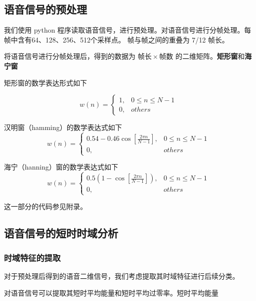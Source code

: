 \hypertarget{ux8bedux97f3ux4fe1ux53f7ux7684ux9884ux5904ux7406}{%
\subsection{语音信号的预处理}\label{ux8bedux97f3ux4fe1ux53f7ux7684ux9884ux5904ux7406}}

我们使用 python
程序读取语音信号，进行预处理。对语音信号进行分帧处理。每帧中含有64、128、256、512个采样点。
帧与帧之间的重叠为 7/12 帧长。


将语音信号进行分帧处理后，得到的数据为 \(帧长 \times 帧数\)
的二维矩阵。\textbf{矩形窗}和\textbf{海宁窗}

矩形窗的数学表达形式如下

\[ w(n) =  \begin{cases} 1, & 0\leq n \leq N-1 \\ 0,  & others \end{cases} \]

汉明窗（hamming）的数学表达式如下
\[ w(n) = \begin{cases} 0.54 - 0.46\cos[\frac{2\pi n}{N-1}], & 0\leq n \leq N-1 \\ 0, & others  \end{cases}\]

海宁（hanning）窗的数学表达式如下
\[ w(n) = \begin{cases} 0.5(1 - \cos[\frac{2\pi n}{N-1}]), & 0\leq n \leq N-1 \\ 0, & others  \end{cases}\]

这一部分的代码参见附录。

\hypertarget{ux8bedux97f3ux4fe1ux53f7ux7684ux77edux65f6ux65f6ux57dfux5206ux6790}{%
\subsection{语音信号的短时时域分析}\label{ux8bedux97f3ux4fe1ux53f7ux7684ux77edux65f6ux65f6ux57dfux5206ux6790}}

\hypertarget{ux65f6ux57dfux7279ux5f81ux7684ux63d0ux53d6}{%
\subsubsection{时域特征的提取}\label{ux65f6ux57dfux7279ux5f81ux7684ux63d0ux53d6}}

对于预处理后得到的语音二维信号，我们考虑提取其时域特征进行后续分类。

对语音信号可以提取其短时平均能量和短时平均过零率。短时平均能量

